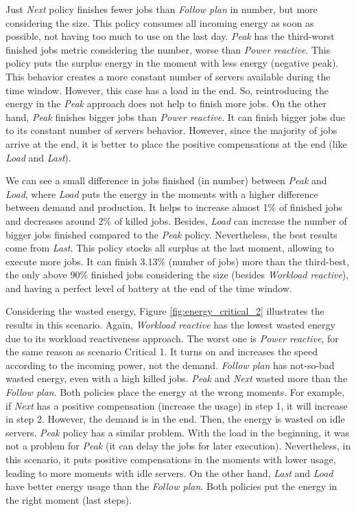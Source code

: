 Just \emph{Next} policy finishes fewer jobs than \emph{Follow plan} in number, but more considering the size. This policy consumes all incoming energy as soon as possible, not having too much to use on the last day. \emph{Peak} has the third-worst finished jobs metric considering the number, worse than \emph{Power reactive}. This policy puts the surplus energy in the moment with less energy (negative peak). This behavior creates a more constant number of servers available during the time window. However, this case has a load in the end. So, reintroducing the energy in the \emph{Peak} approach does not help to finish more jobs. On the other hand, \emph{Peak} finishes bigger jobs than \emph{Power reactive}. It can finish bigger jobs due to its constant number of servers behavior. However, since the majority of jobs arrive at the end, it is better to place the positive compensations at the end (like \emph{Load} and \emph{Last}).

We can see a small difference in jobs finished (in number) between \emph{Peak} and \emph{Load}, where \emph{Load} puts the energy in the moments with a higher difference between demand and production. It helps to increase almost 1\% of finished jobs and decreases around 2\% of killed jobs. Besides, \emph{Load} can increase the number of bigger jobs finished compared to the \emph{Peak} policy. Nevertheless, the best results come from \emph{Last}. This policy stocks all surplus at the last moment, allowing to execute more jobs. It can finish 3.13\% (number of jobs) more than the third-best, the only above 90\% finished jobs considering the size (besides \emph{Workload reactive}), and having a perfect level of battery at the end of the time window.

Considering the wasted energy, Figure \ref{fig:energy_critical_2} illustrates the results in this scenario. Again, \emph{Workload reactive} has the lowest wasted energy due to its workload reactiveness approach. The worst one is \emph{Power reactive}, for the same reason as scenario Critical 1. It turns on and increases the speed according to the incoming power, not the demand. \emph{Follow plan} has not-so-bad wasted energy, even with a high killed jobs. \emph{Peak} and \emph{Next} wasted more than the \emph{Follow plan}. Both policies place the energy at the wrong moments. For example, if \emph{Next} has a positive compensation (increase the usage) in step 1, it will increase in step 2. However, the demand is in the end. Then, the energy is wasted on idle servers. \emph{Peak} policy has a similar problem. With the load in the beginning, it was not a problem for \emph{Peak} (it can delay the jobs for later execution). Nevertheless, in this scenario, it puts positive compensations in the moments with lower usage, leading to more moments with idle servers. On the other hand, \emph{Last} and \emph{Load} have better energy usage than the \emph{Follow plan}. Both policies put the energy in the right moment (last steps).

